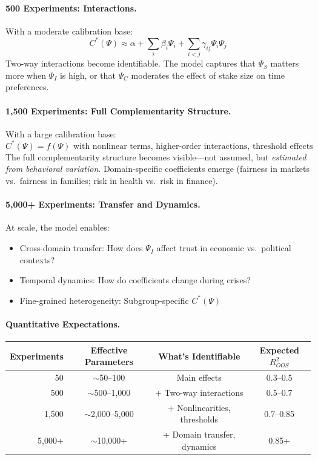 \paragraph{500 Experiments: Interactions.}
With a moderate calibration base:
\begin{equation}
    C^*(\Psi) \approx \alpha + \sum_i \beta_i \Psi_i + \sum_{i<j} \gamma_{ij} \Psi_i \Psi_j
\end{equation}
Two-way interactions become identifiable. The model captures that $\Psi_S$
matters more when $\Psi_I$ is high, or that $\Psi_C$ moderates the effect of
stake size on time preferences.

\paragraph{1,500 Experiments: Full Complementarity Structure.}
With a large calibration base:
\begin{equation}
    C^*(\Psi) = f(\Psi) \text{ with nonlinear terms, higher-order interactions,
    threshold effects}
\end{equation}
The full complementarity structure becomes visible---not assumed, but
\emph{estimated from behavioral variation}. Domain-specific coefficients
emerge (fairness in markets vs.\ fairness in families; risk in health vs.\
risk in finance).

\paragraph{5,000+ Experiments: Transfer and Dynamics.}
At scale, the model enables:
\begin{itemize}
    \item Cross-domain transfer: How does $\Psi_I$ affect trust in economic
          vs.\ political contexts?
    \item Temporal dynamics: How do coefficients change during crises?
    \item Fine-grained heterogeneity: Subgroup-specific $C^*(\Psi)$
\end{itemize}

\paragraph{Quantitative Expectations.}

\begin{center}
\renewcommand{\arraystretch}{1.3}
\begin{tabular}{rccc}
\hline
\textbf{Experiments} & \textbf{Effective Parameters} & \textbf{What's Identifiable} & \textbf{Expected $R^2_{OOS}$} \\
\hline
50 & $\sim$50--100 & Main effects & 0.3--0.5 \\
500 & $\sim$500--1,000 & + Two-way interactions & 0.5--0.7 \\
1,500 & $\sim$2,000--5,000 & + Nonlinearities, thresholds & 0.7--0.85 \\
5,000+ & $\sim$10,000+ & + Domain transfer, dynamics & 0.85+ \\
\hline
\end{tabular}
\end{center}

